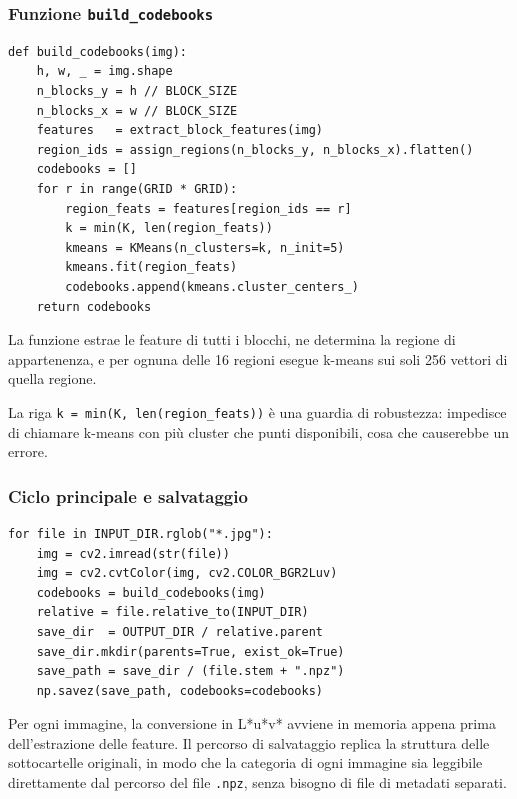 \documentclass[12pt, a4paper]{article}
\begin{document}
\subsubsection{Funzione \texttt{build\_codebooks}}

\begin{lstlisting}[caption={Funzione \texttt{build\_codebooks} (Flat VQ)}]
def build_codebooks(img):
    h, w, _ = img.shape
    n_blocks_y = h // BLOCK_SIZE
    n_blocks_x = w // BLOCK_SIZE
    features   = extract_block_features(img)
    region_ids = assign_regions(n_blocks_y, n_blocks_x).flatten()
    codebooks = []
    for r in range(GRID * GRID):
        region_feats = features[region_ids == r]
        k = min(K, len(region_feats))
        kmeans = KMeans(n_clusters=k, n_init=5)
        kmeans.fit(region_feats)
        codebooks.append(kmeans.cluster_centers_)
    return codebooks
\end{lstlisting}

La funzione estrae le feature di tutti i blocchi, ne determina la regione di appartenenza,
e per ognuna delle 16 regioni esegue k-means sui soli 256 vettori di quella regione.

La riga \texttt{k = min(K, len(region\_feats))} è una guardia di robustezza: impedisce di
chiamare k-means con più cluster che punti disponibili, cosa che causerebbe un errore.

\subsubsection{Ciclo principale e salvataggio}

\begin{lstlisting}[caption={Ciclo principale di \texttt{build\_codebooks.py}}]
for file in INPUT_DIR.rglob("*.jpg"):
    img = cv2.imread(str(file))
    img = cv2.cvtColor(img, cv2.COLOR_BGR2Luv)
    codebooks = build_codebooks(img)
    relative = file.relative_to(INPUT_DIR)
    save_dir  = OUTPUT_DIR / relative.parent
    save_dir.mkdir(parents=True, exist_ok=True)
    save_path = save_dir / (file.stem + ".npz")
    np.savez(save_path, codebooks=codebooks)
\end{lstlisting}

Per ogni immagine, la conversione in L*u*v* avviene in memoria appena prima dell'estrazione
delle feature. Il percorso di salvataggio replica la struttura delle sottocartelle originali,
in modo che la categoria di ogni immagine sia leggibile direttamente dal percorso del file
\texttt{.npz}, senza bisogno di file di metadati separati.
\end{document}

